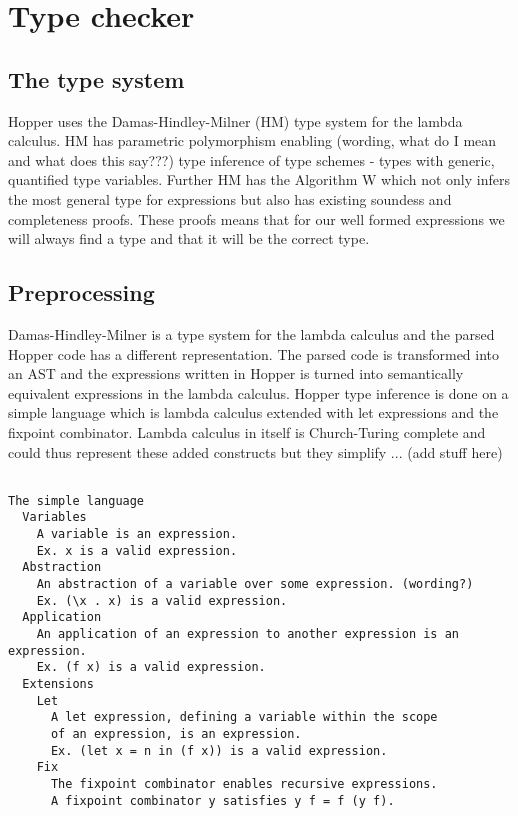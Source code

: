 \section{Type checker}

\subsection{The type system}

Hopper uses the Damas-Hindley-Milner (HM) type system for the lambda calculus. HM has parametric polymorphism enabling (wording, what do I mean and what does this say???) type inference of type schemes - types with generic, quantified type variables. Further HM has the Algorithm W which not only infers the most general type for expressions but also has existing soundess and completeness proofs. These proofs means that for our well formed expressions we will always find a type and that it will be the correct type.

\subsection{Preprocessing}

Damas-Hindley-Milner is a type system for the lambda calculus and the parsed Hopper code has a different representation. The parsed code is transformed into an AST and the expressions written in Hopper is turned into semantically equivalent expressions in the lambda calculus. Hopper type inference is done on a simple language which is lambda calculus extended with let expressions and the fixpoint combinator. Lambda calculus in itself is Church-Turing complete and could thus represent these added constructs but they simplify ... (add stuff here)
\begin{verbatim}

The simple language
  Variables
    A variable is an expression.
    Ex. x is a valid expression.
  Abstraction
    An abstraction of a variable over some expression. (wording?)
    Ex. (\x . x) is a valid expression.
  Application
    An application of an expression to another expression is an expression.
    Ex. (f x) is a valid expression.
  Extensions
    Let
      A let expression, defining a variable within the scope
      of an expression, is an expression.
      Ex. (let x = n in (f x)) is a valid expression. 
    Fix
      The fixpoint combinator enables recursive expressions.
      A fixpoint combinator y satisfies y f = f (y f).

\end{verbatim}

